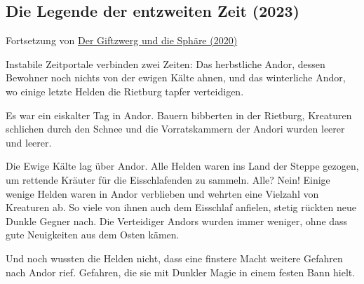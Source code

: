 \begin{chapterbox}
    \chapter{Die Legende der entzweiten Zeit (2023)}
    \label{2023-die-legende-der-entzweiten-zeit}

    \begin{center}
        Fortsetzung von \hyperref[2020-der-giftzwerg-und-die-sphaere]{Der Giftzwerg und die Sphäre (2020)}
    \end{center}
    
    Instabile Zeitportale verbinden zwei Zeiten: Das herbstliche Andor, dessen Bewohner noch nichts von der ewigen Kälte ahnen, und das winterliche Andor, wo einige letzte Helden die Rietburg tapfer verteidigen.


    
\end{chapterbox}



\newpage




Es war ein eiskalter Tag in Andor. Bauern bibberten in der Rietburg, Kreaturen schlichen durch den Schnee und die Vorratskammern der Andori wurden leerer und leerer.

Die Ewige Kälte lag über Andor. Alle Helden waren ins Land der Steppe gezogen, um rettende Kräuter für die Eisschlafenden zu sammeln. Alle? Nein! Einige wenige Helden waren in Andor verblieben und wehrten eine Vielzahl von Kreaturen ab. So viele von ihnen auch dem Eisschlaf anfielen, stetig rückten neue Dunkle Gegner nach. Die Verteidiger Andors wurden immer weniger, ohne dass gute Neuigkeiten aus dem Osten kämen. 

Und noch wussten die Helden nicht, dass eine finstere Macht weitere Gefahren nach Andor rief. Gefahren, die sie mit Dunkler Magie in einem festen Bann hielt.

